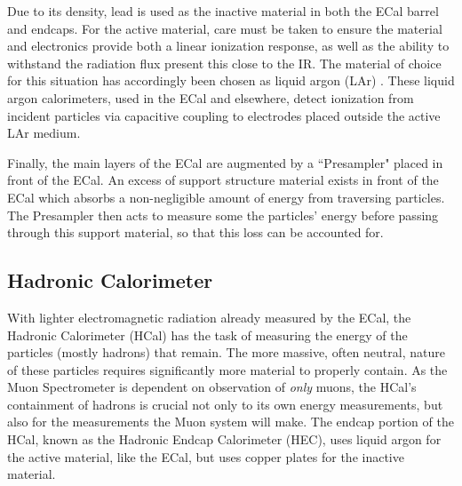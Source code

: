         Due to its density, lead is used as the inactive material in both the ECal barrel and endcaps.
        For the active material, care must be taken to ensure the material and electronics provide both a linear ionization response, as well as the ability to withstand the radiation flux present this close to the IR.
        The material of choice for this situation has accordingly been chosen as liquid argon (LAr) \cite{Lar_cal_tdr}.
        These liquid argon calorimeters, used in the ECal and elsewhere, detect ionization from incident particles via capacitive coupling to electrodes placed outside the active LAr medium.

        Finally, the main layers of the ECal are augmented by a ``Presampler" placed in front of the ECal.
        An excess of support structure material exists in front of the ECal which absorbs a non-negligible amount of energy from traversing particles.
        The Presampler then acts to measure some the particles' energy before passing through this support material, so that this loss can be accounted for.

    \subsection{Hadronic Calorimeter}
        With lighter electromagnetic radiation already measured by the ECal, the Hadronic Calorimeter (HCal) has the task of measuring the energy of the particles (mostly hadrons) that remain.
        The more massive, often neutral, nature of these particles requires significantly more material to properly contain.
        As the Muon Spectrometer is dependent on observation of \textit{only} muons, the HCal's containment of hadrons is crucial not only to its own energy measurements, but also for the measurements the Muon system will make.
        The endcap portion of the HCal, known as the Hadronic Endcap Calorimeter (HEC), uses liquid argon for the active material, like the ECal, but uses copper plates for the inactive material.

